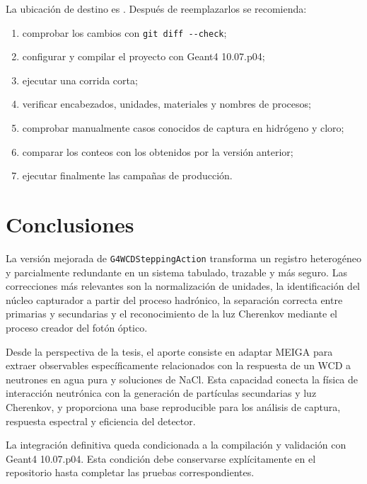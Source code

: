 \documentclass[11pt,a4paper]{article}
\newcommand{\codigo}[1]{\nolinkurl{#1}}
\newcommand{\archivo}[1]{\path{#1}}
\begin{document}
La ubicación de destino es
\archivo{src/Applications/G4WCDSimulator/}. Después de reemplazarlos se
recomienda:

\begin{enumerate}
  \item comprobar los cambios con \codigo{git diff --check};
  \item configurar y compilar el proyecto con Geant4 10.07.p04;
  \item ejecutar una corrida corta;
  \item verificar encabezados, unidades, materiales y nombres de procesos;
  \item comprobar manualmente casos conocidos de captura en hidrógeno y cloro;
  \item comparar los conteos con los obtenidos por la versión anterior;
  \item ejecutar finalmente las campañas de producción.
\end{enumerate}

\section{Conclusiones}

La versión mejorada de \codigo{G4WCDSteppingAction} transforma un registro
heterogéneo y parcialmente redundante en un sistema tabulado, trazable y más
seguro. Las correcciones más relevantes son la normalización de unidades, la
identificación del núcleo capturador a partir del proceso hadrónico, la
separación correcta entre primarias y secundarias y el reconocimiento de la luz
Cherenkov mediante el proceso creador del fotón óptico.

Desde la perspectiva de la tesis, el aporte consiste en adaptar MEIGA para
extraer observables específicamente relacionados con la respuesta de un WCD a
neutrones en agua pura y soluciones de NaCl. Esta capacidad conecta la física
de interacción neutrónica con la generación de partículas secundarias y luz
Cherenkov, y proporciona una base reproducible para los análisis de captura,
respuesta espectral y eficiencia del detector.

La integración definitiva queda condicionada a la compilación y validación con
Geant4 10.07.p04. Esta condición debe conservarse explícitamente en el
repositorio hasta completar las pruebas correspondientes.
\end{document}

